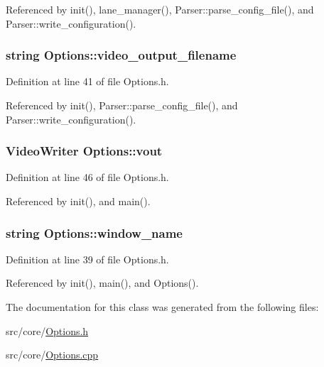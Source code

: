 \-Referenced by init(), lane\-\_\-manager(), \-Parser\-::parse\-\_\-config\-\_\-file(), and \-Parser\-::write\-\_\-configuration().

\hypertarget{class_options_a13788968dfa22a22acc91a75a7711fe6}{
\subsubsection[{video\-\_\-output\-\_\-filename}]{\setlength{\rightskip}{0pt plus 5cm}string {\bf \-Options\-::video\-\_\-output\-\_\-filename}}}
\label{class_options_a13788968dfa22a22acc91a75a7711fe6}


\-Definition at line 41 of file \-Options.\-h.



\-Referenced by init(), \-Parser\-::parse\-\_\-config\-\_\-file(), and \-Parser\-::write\-\_\-configuration().

\hypertarget{class_options_a9bc8c4fa5ddb3adff79c1cb565609bcd}{
\subsubsection[{vout}]{\setlength{\rightskip}{0pt plus 5cm}\-Video\-Writer {\bf \-Options\-::vout}}}
\label{class_options_a9bc8c4fa5ddb3adff79c1cb565609bcd}


\-Definition at line 46 of file \-Options.\-h.



\-Referenced by init(), and main().

\hypertarget{class_options_a0731ed6ef24da67231661711fd29a881}{
\subsubsection[{window\-\_\-name}]{\setlength{\rightskip}{0pt plus 5cm}string {\bf \-Options\-::window\-\_\-name}}}
\label{class_options_a0731ed6ef24da67231661711fd29a881}


\-Definition at line 39 of file \-Options.\-h.



\-Referenced by init(), main(), and \-Options().



\-The documentation for this class was generated from the following files\-:\begin{DoxyCompactItemize}
\item 
src/core/\hyperlink{_options_8h}{\-Options.\-h}\item 
src/core/\hyperlink{_options_8cpp}{\-Options.\-cpp}\end{DoxyCompactItemize}
